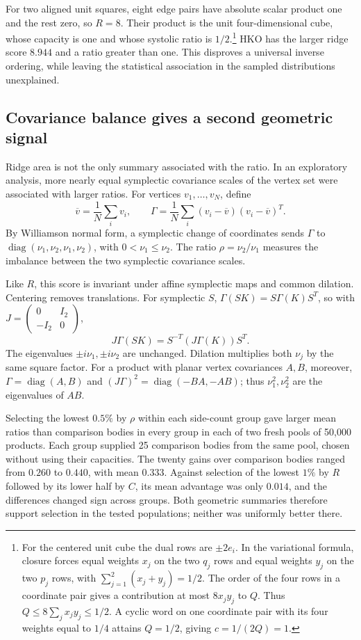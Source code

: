 For two aligned unit
squares, eight edge pairs have absolute scalar product one and the rest
zero, so $R=8$. Their product is the unit four-dimensional cube, whose
capacity is one and whose systolic ratio is $1/2$.\footnote{For the centered
unit cube the dual rows are $\pm2e_i$. In the variational formula, closure
forces equal weights $x_j$ on the two $q_j$ rows and equal weights $y_j$ on
the two $p_j$ rows, with $\sum_{j=1}^2(x_j+y_j)=1/2$. The order of the four
rows in a coordinate pair gives a contribution at most $8x_jy_j$ to $Q$.
Thus $Q\leq8\sum_jx_jy_j\leq1/2$. A cyclic word on one coordinate pair
with its four weights equal to $1/4$ attains $Q=1/2$, giving $c=1/(2Q)=1$.} HKO has the larger ridge
score $8.944$ and a ratio greater than one. This disproves a universal inverse ordering, while leaving the
statistical association in the sampled distributions unexplained.


\subsection{Covariance balance gives a second geometric signal}

Ridge area is not the only summary associated with the ratio. In an
exploratory analysis, more nearly equal symplectic covariance scales of
the vertex set were associated with larger ratios. For vertices
$v_1,\ldots,v_N$, define
\[
 \overline v=\frac1N\sum_i v_i,\qquad
 \Gamma=\frac1N\sum_i(v_i-\overline v)(v_i-\overline v)^T.
\]
By Williamson normal form, a symplectic change of coordinates sends
$\Gamma$ to $\operatorname{diag}(\nu_1,\nu_2,\nu_1,\nu_2)$, with
$0<\nu_1\leq\nu_2$.
The ratio $\rho=\nu_2/\nu_1$ measures the imbalance between the two
symplectic covariance scales.

Like $R$, this score is invariant under affine symplectic maps and common
dilation. Centering removes translations. For symplectic $S$,
$\Gamma(SK)=S\Gamma(K)S^T$, so with
$J=\left(\begin{smallmatrix}0&I_2\\-I_2&0\end{smallmatrix}\right)$,
\[
 J\Gamma(SK)=S^{-T}(J\Gamma(K))S^T.
\]
The eigenvalues $\pm i\nu_1,\pm i\nu_2$ are unchanged. Dilation multiplies
both $\nu_j$ by the same square factor. For a product with planar vertex
covariances $A,B$, moreover, $\Gamma=\operatorname{diag}(A,B)$ and
$(J\Gamma)^2=\operatorname{diag}(-BA,-AB)$; thus $\nu_1^2,\nu_2^2$ are
the eigenvalues of $AB$.

Selecting the lowest $0.5\%$ by $\rho$ within each side-count group
gave larger mean ratios than comparison bodies in every group in each
of two fresh pools of 50,000 products. Each group supplied 25 comparison bodies
from the same pool, chosen without using their capacities. The twenty
gains over comparison bodies ranged from $0.260$ to $0.440$, with mean
$0.333$. Against selection of the lowest $1\%$ by $R$ followed by its
lower half by $C$, its mean advantage was only $0.014$, and the differences
changed sign across groups. Both geometric summaries therefore support
selection in the tested populations; neither was uniformly better there.

